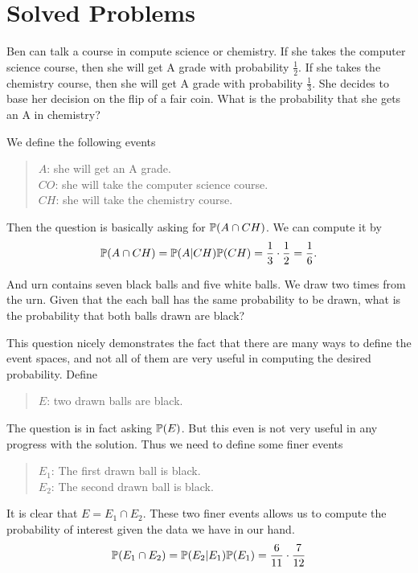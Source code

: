 \section{Solved Problems}
\begin{problem}
	Ben can talk a course in compute science or chemistry. If she takes the computer science course, then she will get A grade with probability $\frac{1}{2}$. If she takes the chemistry course, then she will get A grade with probability $\frac{1}{3}$. She decides to base her decision on the flip of a fair coin. What is the probability that she gets an A in chemistry?
\end{problem}
\begin{solution}
	We define the following events
	\begin{quote}
		$A$: she will get an A grade.\\
		$CO$: she will take the computer science course.\\
		$CH$: she will take the chemistry course.
	\end{quote}
	Then the question is basically asking for $\mathbb{P}(A \cap CH)$. We can compute it by
	\[ \mathbb{P}(A \cap CH) = \mathbb{P}(A|CH)\mathbb{P}(CH) = \frac{1}{3}\cdot\frac{1}{2} = \frac{1}{6}. \]
\end{solution}

\begin{problem}
	And urn contains seven black balls and five white balls. We draw two times from the urn. Given that the each ball has the same probability to be drawn, what is the probability that both balls drawn are black?
\end{problem}
\begin{solution}
	This question nicely demonstrates the fact that there are many ways to define the event spaces, and not all of them are very useful in computing the desired probability. Define
	\begin{quote}
		$E$: two drawn balls are black.
	\end{quote}
	The question is in fact asking $\mathbb{P}(E)$. But this even is not very useful in any progress with the solution. Thus we need to define some finer events
	\begin{quote}
		$E_1$: The first drawn ball is black.\\
		$E_2$: The second drawn ball is black.
	\end{quote}
	It is clear that $E = E_1 \cap E_2$. These two finer events allows us to compute the probability of interest given the data we have in our hand.
	\[ \mathbb{P}(E_1 \cap E_2) = \mathbb{P}(E_2 | E_1) \mathbb{P}(E_1) = \frac{6}{11} \cdot \frac{7}{12} \]
\end{solution}

